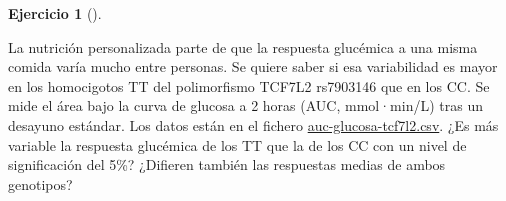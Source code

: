 \documentclass[
  spanish,
  a4paper,
]{scrreport}
\theoremstyle{definition}
\newtheorem{exercise}{Ejercicio}[chapter]
\theoremstyle{remark}
\begin{document}
\begin{exercise}[]\protect\hypertarget{exr-contraste-ia-comparacion-varianzas-tcf7l2}{}\label{exr-contraste-ia-comparacion-varianzas-tcf7l2}

La nutrición personalizada parte de que la respuesta glucémica a una
misma comida varía mucho entre personas. Se quiere saber si esa
variabilidad es mayor en los homocigotos TT del polimorfismo TCF7L2
rs7903146 que en los CC. Se mide el área bajo la curva de glucosa a 2
horas (AUC, mmol·min/L) tras un desayuno estándar. Los datos están en el
fichero \href{datos/auc-glucosa-tcf7l2.csv}{auc-glucosa-tcf7l2.csv}. ¿Es
más variable la respuesta glucémica de los TT que la de los CC con un
nivel de significación del 5\%? ¿Difieren también las respuestas medias
de ambos genotipos?

\end{exercise}
\end{document}
